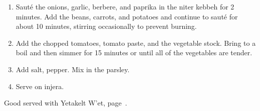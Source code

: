 
\label{yetakelt-wet}

\begin{ingredients}
\end{ingredients}


\begin{recipe}
  \begin{enumerate}

  \item Saut\'e the onions, garlic, berbere, and paprika in the niter
    kebbeh for 2 minutes.  Add the beans, carrots, and potatoes and
    continue to saut\'e for about 10 minutes, stirring occasionally to
    prevent burning.

  \item Add the chopped tomatoes, tomato paste, and the vegetable
    stock.  Bring to a boil and then simmer for 15 minutes or until
    all of the vegetables are tender.

  \item Add salt, pepper.  Mix in the parsley.

  \item Serve on injera.

  \end{enumerate}

Good served with Yetakelt W'et, page~\pageref{yemiser-wet}.

\end{recipe}
